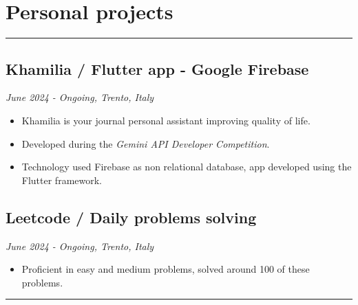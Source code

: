 \documentclass[a4paper,10pt]{article}
\begin{document}
\begin{minipage}[t]{0.25\textwidth}
    \section*{Personal projects}
    \vspace{3.4cm} %
    \rule{0.6cm}{0.3mm}
\end{minipage}
\hfill
\begin{minipage}[t]{0.75\textwidth}
     \subsection*{Khamilia / Flutter app - Google Firebase }
    \textit{June 2024 - Ongoing, Trento, Italy} \\
    \begin{itemize}[leftmargin=1cm]
        \item Khamilia is your journal personal assistant improving quality of life.
        \item Developed during the \textit{Gemini API Developer Competition}.
        \item Technology used Firebase as non relational database, app developed using the Flutter framework.
    \end{itemize}
    \subsection*{Leetcode / Daily problems solving }
    \textit{June 2024 - Ongoing, Trento, Italy} \\
    \begin{itemize}[leftmargin=1cm]
        \item Proficient in easy and medium problems, solved around 100 of these problems. 
    \end{itemize}
    \rule{\linewidth}{0.5mm}
\end{minipage}
\end{document}
